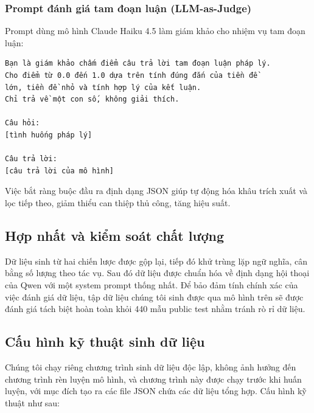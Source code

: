 \subsubsection{Prompt đánh giá tam đoạn luận (LLM-as-Judge)}

Prompt dùng mô hình Claude Haiku 4.5 làm giám khảo cho nhiệm vụ tam đoạn luận:
\begin{verbatim}
Bạn là giám khảo chấm điểm câu trả lời tam đoạn luận pháp lý.
Cho điểm từ 0.0 đến 1.0 dựa trên tính đúng đắn của tiền đề
lớn, tiền đề nhỏ và tính hợp lý của kết luận.
Chỉ trả về một con số, không giải thích.

Câu hỏi:
[tình huống pháp lý]

Câu trả lời:
[câu trả lời của mô hình]
\end{verbatim}

Việc bắt ràng buộc đầu ra định dạng JSON giúp tự động hóa khâu trích xuất và lọc tiếp theo, giảm thiểu can thiệp thủ công, tăng hiệu suất.

\subsection{Hợp nhất và kiểm soát chất lượng}

Dữ liệu sinh từ hai chiến lược được gộp lại, tiếp đó khử trùng lặp ngữ nghĩa, cân bằng số lượng theo tác vụ. Sau đó dữ liệu được chuẩn hóa về định dạng hội thoại của Qwen với một system prompt thống nhất. Để bảo đảm tính chính xác của việc đánh giá dữ liệu, tập dữ liệu chúng tôi sinh được qua mô hình trên sẽ được đánh giá tách biệt hoàn toàn khỏi 440 mẫu public test nhằm tránh rò rỉ dữ liệu.

\subsection{Cấu hình kỹ thuật sinh dữ liệu}

Chúng tôi chạy riêng chương trình sinh dữ liệu độc lập, không ảnh hưởng đến chương trình rèn luyện mô hình, và chương trình này được chạy trước khi huấn luyện, với mục đích tạo ra các file JSON chứa các dữ liệu tổng hợp. Cấu hình kỹ thuật như sau:

